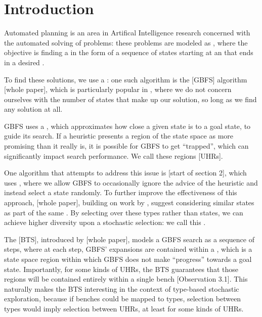 \chapter{Introduction}

Automated planning is an area in Artifical Intelligence research concerned with the automated solving of problems: these problems are modeled as , where the objective is finding a  in the form of a sequence of states starting at an  that ends in a desired .

To find these solutions, we use a : one such algorithm is the [GBFS] algorithm [whole paper], which is particularly popular in , where we do not concern ourselves with the number of states that make up our solution, so long as we find any solution at all.

GBFS uses a , which approximates how close a given state is to a goal state, to guide its search. If a heuristic presents a region of the state space as more promising than it really is, it is possible for GBFS to get ``trapped'', which can significantly impact search performance. We call these regions [UHRs].

One algorithm that attempts to address this issue is  [start of section 2], which uses , where we allow GBFS to occasionally ignore the advice of the heuristic and instead select a state randomly. To further improve the effectiveness of this approach, [whole paper], building on work by , suggest considering similar states as part of the same . By selecting over these types rather than states, we can achieve higher diversity upon a stochastic selection: we call this .

The [BTS], introduced by [whole paper], models a GBFS search as a sequence of steps, where at each step, GBFS' expansions are contained within a , which is a state space region within which GBFS does not make ``progress'' towards a goal state. Importantly, for some kinds of UHRs, the BTS guarantees that those regions will be contained entirely within a single bench [Observation 3.1]. This naturally makes the BTS interesting in the context of type-based stochastic exploration, because if benches could be mapped to types, selection between types would imply selection between UHRs, at least for some kinds of UHRs.

